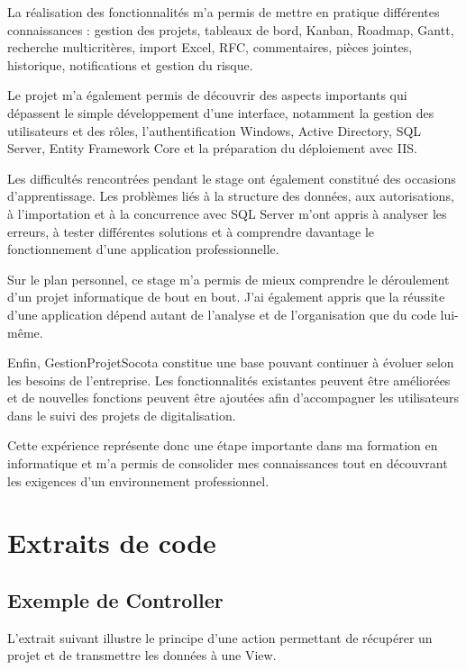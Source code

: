 \documentclass[12pt,a4paper,oneside]{report}
\begin{document}
La réalisation des fonctionnalités m'a permis de mettre en pratique différentes connaissances : gestion des projets, tableaux de bord, Kanban, Roadmap, Gantt, recherche multicritères, import Excel, RFC, commentaires, pièces jointes, historique, notifications et gestion du risque.

Le projet m'a également permis de découvrir des aspects importants qui dépassent le simple développement d'une interface, notamment la gestion des utilisateurs et des rôles, l'authentification Windows, Active Directory, SQL Server, Entity Framework Core et la préparation du déploiement avec IIS.

Les difficultés rencontrées pendant le stage ont également constitué des occasions d'apprentissage. Les problèmes liés à la structure des données, aux autorisations, à l'importation et à la concurrence avec SQL Server m'ont appris à analyser les erreurs, à tester différentes solutions et à comprendre davantage le fonctionnement d'une application professionnelle.

Sur le plan personnel, ce stage m'a permis de mieux comprendre le déroulement d'un projet informatique de bout en bout. J'ai également appris que la réussite d'une application dépend autant de l'analyse et de l'organisation que du code lui-même.

Enfin, GestionProjetSocota constitue une base pouvant continuer à évoluer selon les besoins de l'entreprise. Les fonctionnalités existantes peuvent être améliorées et de nouvelles fonctions peuvent être ajoutées afin d'accompagner les utilisateurs dans le suivi des projets de digitalisation.

Cette expérience représente donc une étape importante dans ma formation en informatique et m'a permis de consolider mes connaissances tout en découvrant les exigences d'un environnement professionnel.

\appendix

\chapter{Extraits de code}

\section{Exemple de Controller}

L'extrait suivant illustre le principe d'une action permettant de récupérer un projet et de transmettre les données à une View.
\end{document}
